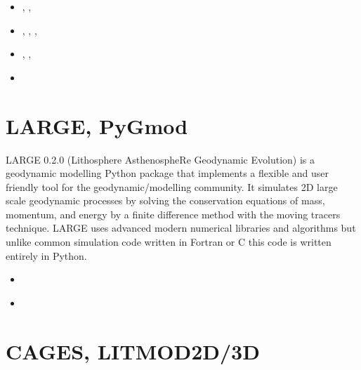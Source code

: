 \begin{small}
\begin{itemize}
\item[\twothousandfive]      \textcite{sopg05},  \textcite{baso05},  \textcite{soba05}
\item[\twothousandsix]       \textcite{bube06},  \textcite{basv06},  \textcite{sobk06},
                             \textcite{peso06}
\item[\twothousandeight]     \textcite{peso08},  \textcite{baso08},  \textcite{scbe08}
\item[\twothousandeleven]    \textcite{sosk11}
\end{itemize}
\end{small}


\section{LARGE, PyGmod}

LARGE 0.2.0 (Lithosphere AsthenospheRe Geodynamic Evolution) is a geodynamic modelling
Python package that implements a flexible and user friendly tool for the 
geodynamic/modelling community. It simulates 2D large scale geodynamic processes by 
solving the conservation equations of mass, momentum, and energy by a finite difference
method with the moving tracers technique. LARGE uses advanced modern numerical libraries 
and algorithms but unlike common simulation code written in Fortran or C this code is 
written entirely in Python.

\begin{small}
\begin{itemize}
\item[\twothousandfifteen] \textcite{crvs15}
\item[\twothousandtwenty]  \textcite{crvi20}
\end{itemize}
\end{small}

\section{CAGES, LITMOD2D/3D}

